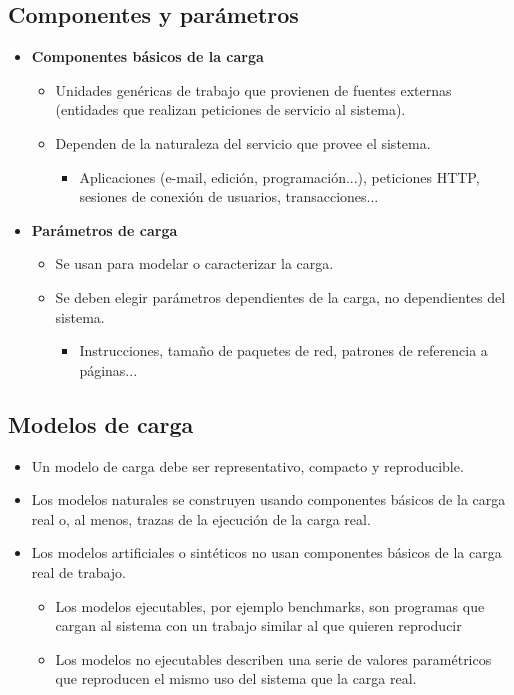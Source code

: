 \subsection{Componentes y parámetros}
\begin{itemize}
    \item \textbf{Componentes básicos de la carga}
    \begin{itemize}
        \item Unidades genéricas de trabajo que provienen de fuentes externas (entidades que realizan peticiones de servicio al sistema).
        \item Dependen de la naturaleza del servicio que provee el sistema.
        \begin{itemize}
        \item Aplicaciones (e-mail, edición, programación...), peticiones HTTP, sesiones de conexión de usuarios, transacciones...
        \end{itemize}
    \end{itemize}
\item \textbf{Parámetros de carga}
\begin{itemize}
        \item Se usan para modelar o caracterizar la carga.
        \item Se deben elegir parámetros dependientes de la carga, no dependientes del sistema.
        \begin{itemize}
        \item Instrucciones, tamaño de paquetes de red, patrones de referencia a páginas...
        \end{itemize}
    \end{itemize}
\end{itemize}
\subsection{Modelos de carga}
\begin{itemize}
    \item Un modelo de carga debe ser representativo, compacto y reproducible.
    \item Los modelos naturales se construyen usando componentes básicos de la carga real o, al          menos, trazas de la ejecución de la carga real.
    \item Los modelos artificiales o sintéticos no usan componentes básicos de la carga real de trabajo.
    \begin{itemize}
        \item Los modelos ejecutables, por ejemplo benchmarks, son programas que cargan al sistema con un trabajo similar al que quieren reproducir 
        \item Los modelos no ejecutables describen una serie de valores paramétricos que reproducen el mismo uso del sistema que la carga real.
    \end{itemize}
\end{itemize}
\newpage
